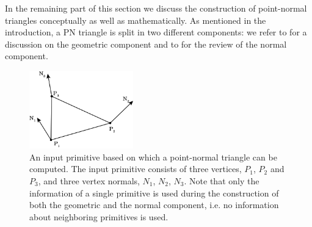 In the remaining part of this section we discuss the construction of point-normal triangles conceptually as well as mathematically. As mentioned in the introduction, a PN triangle is split in two different components: we refer to  for a discussion on the geometric component and to  for the review of the normal component.

\begin{figure}
	\centering
	\includegraphics[width=0.4\textwidth]{./content/img/method/inputPrimitive.png}
	\caption{An input primitive based on which a point-normal triangle can be computed. The input primitive consists of three vertices, $P_1$, $P_2$ and $P_3$, and three vertex normals, $N_1$, $N_2$, $N_3$. Note that only the information of a single primitive is used during the construction of both the geometric and the normal component, i.e. no information about neighboring primitives is used.}
	\label{fig:method:input_primitive}
\end{figure}

% 


